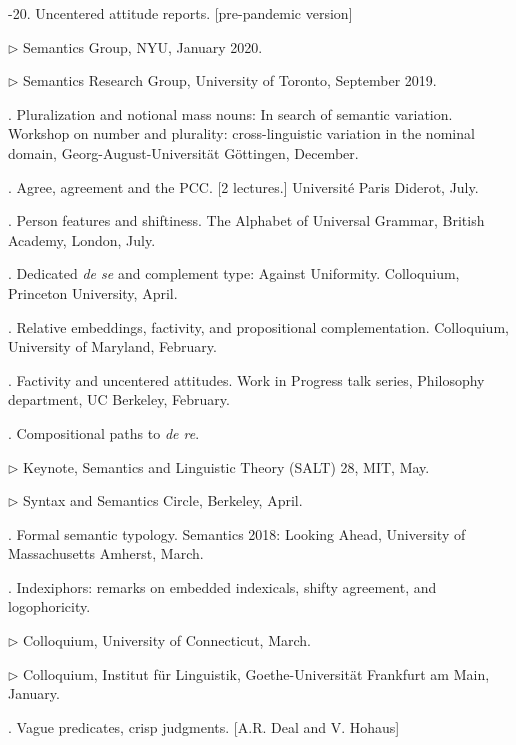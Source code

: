 \documentclass[12pt]{article}
\begin{document}
-20. Uncentered attitude reports. [pre-pandemic version]

\indd $\rhd$ Semantics Group, NYU, January 2020. 

\indd $\rhd$ Semantics Research Group, University of Toronto, September 2019.



.  Pluralization and notional mass nouns: In search of semantic variation. Workshop on number and plurality: cross-linguistic variation in the nominal domain, Georg-August-Universit\"at G\"ottingen, December. 


. Agree, agreement and the PCC. [2 lectures.] Universit\'e Paris Diderot, July.


. Person features and shiftiness. The Alphabet of Universal Grammar, British Academy, London, July. 

.  Dedicated \emph{de se} and complement type: Against Uniformity. Colloquium, Princeton University, April. 


. Relative embeddings, factivity, and propositional complementation. Colloquium,  University of Maryland, February. 



. Factivity and uncentered attitudes. Work in Progress talk series, Philosophy department, UC Berkeley, February. 



. Compositional paths to \emph{de re}. 

\indd $\rhd$ Keynote, Semantics and Linguistic Theory (SALT) 28, MIT, May.


\indd $\rhd$ Syntax and Semantics Circle, Berkeley, April. 

. Formal semantic typology.  Semantics 2018: Looking Ahead, University of Massachusetts Amherst, March. 




. Indexiphors: remarks on embedded indexicals, shifty agreement, and logophoricity. 

\indd $\rhd$ Colloquium, University of Connecticut, March.


\indd $\rhd$ Colloquium, Institut f\"ur Linguistik, Goethe-Universit\"at  Frankfurt am Main, January.


. Vague predicates, crisp judgments. [A.R. Deal and V. Hohaus] 
\end{document}
